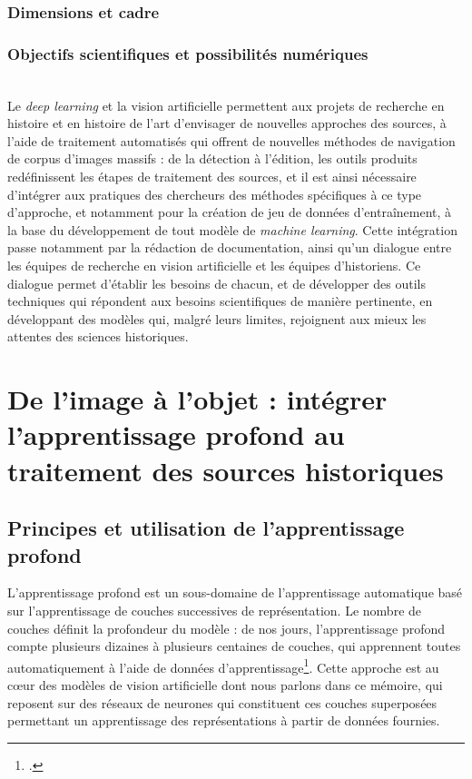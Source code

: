 \documentclass[a4paper,12pt,twoside]{book}
\newcommand{\dl}{\textit{deep learning}\xspace}
\newcommand{\ml}{\textit{machine learning}\xspace}
\newcommand{\clearemptydoublepage}{\newpage{\pagestyle{empty}\cleardoublepage}}
\begin{document}
            \section{Dimensions et cadre}
                
        
            \section{\label{objectifsPossibilites}Objectifs scientifiques et possibilités numériques}
                
        	\\
        
        Le \dl et la vision artificielle permettent aux projets de recherche en histoire et en histoire de l'art d'envisager de nouvelles approches des sources, à l'aide de traitement automatisés qui offrent de nouvelles méthodes de navigation de corpus d'images massifs : de la détection à l'édition, les outils produits redéfinissent les étapes de traitement des sources, et il est ainsi nécessaire d'intégrer aux pratiques des chercheurs des méthodes spécifiques à ce type d'approche, et notamment pour la création de jeu de données d'entraînement, à la base du développement de tout modèle de \ml. Cette intégration passe notamment par la rédaction de documentation, ainsi qu'un dialogue entre les équipes de recherche en vision artificielle et les équipes d'historiens. Ce dialogue permet d'établir les besoins de chacun, et de développer des outils techniques qui répondent aux besoins scientifiques de manière pertinente, en développant des modèles qui, malgré leurs limites, rejoignent aux mieux les attentes des sciences historiques.
        \clearemptydoublepage


    \part{De l’image à l’objet : intégrer l’apprentissage profond au traitement des sources historiques}
        \chapter[L'apprentissage profond]{Principes et utilisation de l’apprentissage profond}
        L'apprentissage profond est un sous-domaine de l'apprentissage automatique basé sur l'apprentissage de couches successives de représentation. Le nombre de couches définit la profondeur du modèle : de nos jours, l'apprentissage profond compte plusieurs dizaines à plusieurs centaines de couches, qui apprennent toutes automatiquement à l'aide de données d'apprentissage\footcite{cholletApprentissageProfondAvec2020a}. Cette approche est au cœur des modèles de vision artificielle dont nous parlons dans ce mémoire, qui reposent sur des réseaux de neurones qui constituent ces couches superposées permettant un apprentissage des représentations à partir de données fournies.
        
\end{document}
